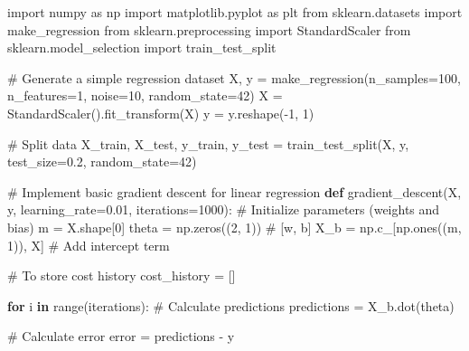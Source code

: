 \documentclass[
  letterpaper,
  DIV=11,
  numbers=noendperiod]{scrreprt}
\newenvironment{Shaded}{\begin{snugshade}}{\end{snugshade}}
\newcommand{\BuiltInTok}[1]{\textcolor[rgb]{0.00,0.23,0.31}{#1}}
\newcommand{\CommentTok}[1]{\textcolor[rgb]{0.37,0.37,0.37}{#1}}
\newcommand{\ControlFlowTok}[1]{\textcolor[rgb]{0.00,0.23,0.31}{\textbf{#1}}}
\newcommand{\DecValTok}[1]{\textcolor[rgb]{0.68,0.00,0.00}{#1}}
\newcommand{\FloatTok}[1]{\textcolor[rgb]{0.68,0.00,0.00}{#1}}
\newcommand{\ImportTok}[1]{\textcolor[rgb]{0.00,0.46,0.62}{#1}}
\newcommand{\KeywordTok}[1]{\textcolor[rgb]{0.00,0.23,0.31}{\textbf{#1}}}
\newcommand{\NormalTok}[1]{\textcolor[rgb]{0.00,0.23,0.31}{#1}}
\newcommand{\OperatorTok}[1]{\textcolor[rgb]{0.37,0.37,0.37}{#1}}
\begin{document}
\begin{Shaded}
\begin{Highlighting}[]
\ImportTok{import}\NormalTok{ numpy }\ImportTok{as}\NormalTok{ np}
\ImportTok{import}\NormalTok{ matplotlib.pyplot }\ImportTok{as}\NormalTok{ plt}
\ImportTok{from}\NormalTok{ sklearn.datasets }\ImportTok{import}\NormalTok{ make\_regression}
\ImportTok{from}\NormalTok{ sklearn.preprocessing }\ImportTok{import}\NormalTok{ StandardScaler}
\ImportTok{from}\NormalTok{ sklearn.model\_selection }\ImportTok{import}\NormalTok{ train\_test\_split}

\CommentTok{\# Generate a simple regression dataset}
\NormalTok{X, y }\OperatorTok{=}\NormalTok{ make\_regression(n\_samples}\OperatorTok{=}\DecValTok{100}\NormalTok{, n\_features}\OperatorTok{=}\DecValTok{1}\NormalTok{, noise}\OperatorTok{=}\DecValTok{10}\NormalTok{, random\_state}\OperatorTok{=}\DecValTok{42}\NormalTok{)}
\NormalTok{X }\OperatorTok{=}\NormalTok{ StandardScaler().fit\_transform(X)}
\NormalTok{y }\OperatorTok{=}\NormalTok{ y.reshape(}\OperatorTok{{-}}\DecValTok{1}\NormalTok{, }\DecValTok{1}\NormalTok{)}

\CommentTok{\# Split data}
\NormalTok{X\_train, X\_test, y\_train, y\_test }\OperatorTok{=}\NormalTok{ train\_test\_split(X, y, test\_size}\OperatorTok{=}\FloatTok{0.2}\NormalTok{, random\_state}\OperatorTok{=}\DecValTok{42}\NormalTok{)}

\CommentTok{\# Implement basic gradient descent for linear regression}
\KeywordTok{def}\NormalTok{ gradient\_descent(X, y, learning\_rate}\OperatorTok{=}\FloatTok{0.01}\NormalTok{, iterations}\OperatorTok{=}\DecValTok{1000}\NormalTok{):}
    \CommentTok{\# Initialize parameters (weights and bias)}
\NormalTok{    m }\OperatorTok{=}\NormalTok{ X.shape[}\DecValTok{0}\NormalTok{]}
\NormalTok{    theta }\OperatorTok{=}\NormalTok{ np.zeros((}\DecValTok{2}\NormalTok{, }\DecValTok{1}\NormalTok{))  }\CommentTok{\# [w, b]}
\NormalTok{    X\_b }\OperatorTok{=}\NormalTok{ np.c\_[np.ones((m, }\DecValTok{1}\NormalTok{)), X]  }\CommentTok{\# Add intercept term}
    
    \CommentTok{\# To store cost history}
\NormalTok{    cost\_history }\OperatorTok{=}\NormalTok{ []}
    
    \ControlFlowTok{for}\NormalTok{ i }\KeywordTok{in} \BuiltInTok{range}\NormalTok{(iterations):}
        \CommentTok{\# Calculate predictions}
\NormalTok{        predictions }\OperatorTok{=}\NormalTok{ X\_b.dot(theta)}
        
        \CommentTok{\# Calculate error}
\NormalTok{        error }\OperatorTok{=}\NormalTok{ predictions }\OperatorTok{{-}}\NormalTok{ y}
        

\end{Highlighting}
\end{Shaded}
\end{document}
